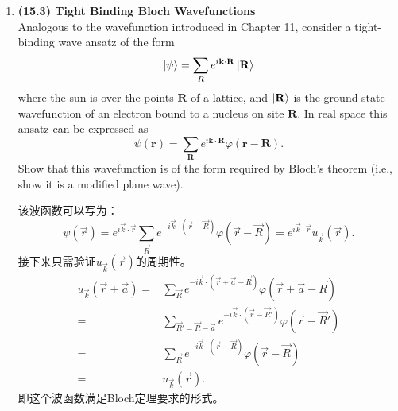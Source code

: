 \documentclass[reqno,a4paper,12pt]{amsart}
\begin{document}
\begin{enumerate}[1.]
\item \textbf{(15.3) Tight Binding Bloch Wavefunctions} \\
Analogous to the wavefunction introduced in Chapter 11, consider a tight-binding wave ansatz of the form 
\[
	\ket{\psi} = \sum_{R} e^{i\mathbf{k}\cdot\mathbf{R}} \ket{\mathbf{R}}
\]
where the sun is over the points $\mathbf{R}$ of a lattice, and $\ket{\mathbf{R}}$ is the ground-state wavefunction of an electron bound to a nucleus on site $\mathbf{R}$. In real space this ansatz can be expressed as 
\[
	\psi(\mathbf{r}) = \sum_{\mathbf{R}} e^{i\mathbf{k} \cdot \mathbf{R}} \varphi(\mathbf{r} - \mathbf{R}).
\]
Show that this wavefunction is of the form required by Bloch's theorem (i.e., show it is a modified plane wave).
\begin{tcolorbox}[breakable, colback = black!5!white, colframe = black]
该波函数可以写为：
\[
	\psi(\vec{r}) = e^{i\vec{k} \cdot \vec{r}} \sum_{\vec{R}} e^{-i\vec{k}\cdot(\vec{r}-\vec{R})} \varphi(\vec{r}-\vec{R}) = e^{i\vec{k}\cdot\vec{r}} u_{\vec{k}}(\vec{r}).
\]
接下来只需验证$u_{\vec{k}}(\vec{r})$的周期性。
\begin{align*}
	u_{\vec{k}}(\vec{r}+\vec{a}) =& \sum_{\vec{R}} e^{-i\vec{k}\cdot(\vec{r}+\vec{a}-\vec{R})} \varphi(\vec{r}+\vec{a}-\vec{R}) \\
	=& \sum_{\vec{R}' = \vec{R}-\vec{a}} e^{-i\vec{k}\cdot(\vec{r}-\vec{R}')} \varphi(\vec{r}-\vec{R}') \\
	=& \sum_{\vec{R}} e^{-i\vec{k}\cdot(\vec{r}-\vec{R})} \varphi(\vec{r}-\vec{R}) \\
	=& u_{\vec{k}}(\vec{r}).
\end{align*}
即这个波函数满足Bloch定理要求的形式。
\end{tcolorbox}


\end{enumerate}
\end{document}
